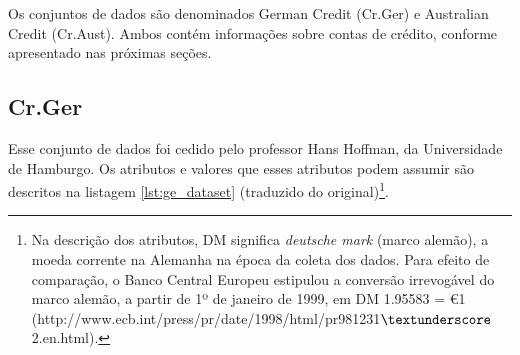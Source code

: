 Os conjuntos de dados são denominados German Credit (Cr.Ger) e Australian Credit (Cr.Aust). Ambos contém informações sobre contas de crédito, conforme apresentado nas próximas seções.

\subsection{Cr.Ger}

Esse conjunto de dados foi cedido pelo professor Hans Hoffman, da Universidade de Hamburgo. Os atributos e valores que esses atributos podem assumir são descritos na listagem \ref{lst:ge_dataset} (traduzido do original)\footnote{Na descrição dos atributos, DM significa \emph{deutsche mark} (marco alemão), a moeda corrente na Alemanha na época da coleta dos dados. Para efeito de comparação, o Banco Central Europeu estipulou a conversão irrevogável do marco alemão, a partir de 1º de janeiro de 1999, em DM 1.95583 = \euro 1 (http://www.ecb.int/press/pr/date/1998/html/pr981231$\textunderscore$2.en.html).}.

